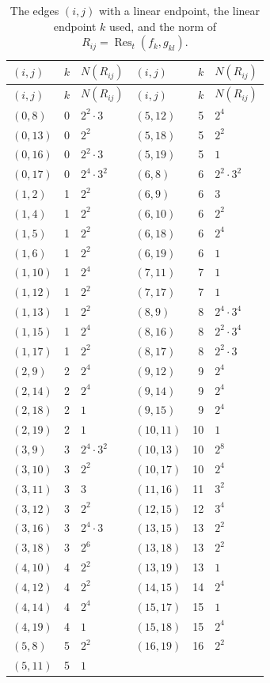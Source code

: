 \documentclass[11pt]{article}
\begin{document}
\begingroup\small
\setlength{\LTcapwidth}{\textwidth}
\begin{longtable}{@{}lrl@{\qquad}lrl@{}}
\caption{The edges $(i,j)$ with a linear endpoint, the linear endpoint $k$ used, and the norm of $R_{ij}=\operatorname{Res}_t(f_k,g_{kl})$.}\label{tab:sep}\\
\hline $(i,j)$ & $k$ & $N(R_{ij})$ & $(i,j)$ & $k$ & $N(R_{ij})$\\\hline\endfirsthead\hline $(i,j)$ & $k$ & $N(R_{ij})$ & $(i,j)$ & $k$ & $N(R_{ij})$\\\hline\endhead\hline\endfoot
$(0,8)$ & 0 & $2^{2}\cdot 3$ & $(5,12)$ & 5 & $2^{4}$\\
$(0,13)$ & 0 & $2^{2}$ & $(5,18)$ & 5 & $2^{2}$\\
$(0,16)$ & 0 & $2^{2}\cdot 3$ & $(5,19)$ & 5 & $1$\\
$(0,17)$ & 0 & $2^{4}\cdot 3^{2}$ & $(6,8)$ & 6 & $2^{2}\cdot 3^{2}$\\
$(1,2)$ & 1 & $2^{2}$ & $(6,9)$ & 6 & $3$\\
$(1,4)$ & 1 & $2^{2}$ & $(6,10)$ & 6 & $2^{2}$\\
$(1,5)$ & 1 & $2^{2}$ & $(6,18)$ & 6 & $2^{4}$\\
$(1,6)$ & 1 & $2^{2}$ & $(6,19)$ & 6 & $1$\\
$(1,10)$ & 1 & $2^{4}$ & $(7,11)$ & 7 & $1$\\
$(1,12)$ & 1 & $2^{2}$ & $(7,17)$ & 7 & $1$\\
$(1,13)$ & 1 & $2^{2}$ & $(8,9)$ & 8 & $2^{4}\cdot 3^{4}$\\
$(1,15)$ & 1 & $2^{4}$ & $(8,16)$ & 8 & $2^{2}\cdot 3^{4}$\\
$(1,17)$ & 1 & $2^{2}$ & $(8,17)$ & 8 & $2^{2}\cdot 3$\\
$(2,9)$ & 2 & $2^{4}$ & $(9,12)$ & 9 & $2^{4}$\\
$(2,14)$ & 2 & $2^{4}$ & $(9,14)$ & 9 & $2^{4}$\\
$(2,18)$ & 2 & $1$ & $(9,15)$ & 9 & $2^{4}$\\
$(2,19)$ & 2 & $1$ & $(10,11)$ & 10 & $1$\\
$(3,9)$ & 3 & $2^{4}\cdot 3^{2}$ & $(10,13)$ & 10 & $2^{8}$\\
$(3,10)$ & 3 & $2^{2}$ & $(10,17)$ & 10 & $2^{4}$\\
$(3,11)$ & 3 & $3$ & $(11,16)$ & 11 & $3^{2}$\\
$(3,12)$ & 3 & $2^{2}$ & $(12,15)$ & 12 & $3^{4}$\\
$(3,16)$ & 3 & $2^{4}\cdot 3$ & $(13,15)$ & 13 & $2^{2}$\\
$(3,18)$ & 3 & $2^{6}$ & $(13,18)$ & 13 & $2^{2}$\\
$(4,10)$ & 4 & $2^{2}$ & $(13,19)$ & 13 & $1$\\
$(4,12)$ & 4 & $2^{2}$ & $(14,15)$ & 14 & $2^{4}$\\
$(4,14)$ & 4 & $2^{4}$ & $(15,17)$ & 15 & $1$\\
$(4,19)$ & 4 & $1$ & $(15,18)$ & 15 & $2^{4}$\\
$(5,8)$ & 5 & $2^{2}$ & $(16,19)$ & 16 & $2^{2}$\\
$(5,11)$ & 5 & $1$ & & &\\
\end{longtable}
\endgroup
\end{document}
